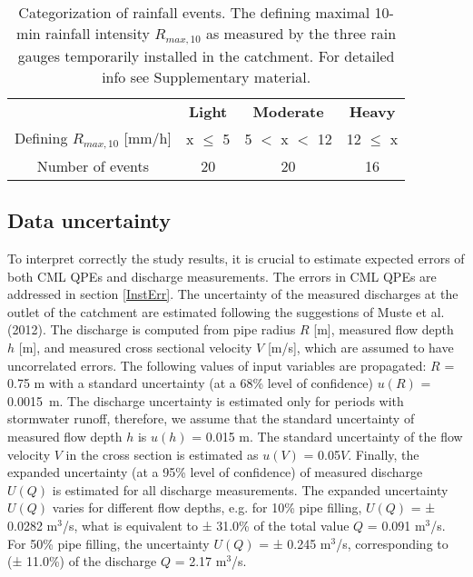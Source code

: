 \documentclass{ctuthesis}\usepackage[]{graphicx}\usepackage[]{color}
\begin{document}
\begin{table}[h]
\begin{ctucolortab}
\centering
\begin{tabular}{ c | c  c  c  }
	    &       \textbf{Light}   &  \bfseries Moderate  &  \bfseries  Heavy    \\ \Midrule
        Defining $R_{max,10}$ [mm/h]  &  x $\leq$ 5  & 5 $<$ x $<$ 12 &  12 $\leq$ x     \\
            Number of events  &  20  & 20 &  16
\end{tabular}
\caption{Categorization of rainfall events. The defining maximal 10-min rainfall intensity $R_{max,10}$ as measured by the three rain gauges temporarily installed in the catchment. For detailed info see Supplementary material.}
\label{2tab2}
\end{ctucolortab}
\end{table}



\subsection{Data uncertainty} \label{Quncer}

To interpret correctly the study results, it is crucial to estimate expected errors of both CML QPEs and discharge measurements. The errors in CML QPEs are addressed in section \ref{InstErr}. The uncertainty of the measured discharges at the outlet of the catchment are estimated following the suggestions of Muste et al. (2012). The discharge is computed from pipe radius $R$ [m], measured flow depth $h$ [m], and measured cross sectional velocity $V$ [m/s], which are assumed to have uncorrelated errors. The following values of input variables are propagated: $R$ = 0.75 m with a standard uncertainty (at a 68\% level of confidence) $u(R)$ = 0.0015~m. The discharge uncertainty is estimated only for periods with stormwater runoff, therefore, we assume that the standard uncertainty of measured flow depth $h$ is $u(h)$ = 0.015 m. The standard uncertainty of the flow velocity $V$ in the cross section is estimated as $u(V)$ = 0.05$V$. Finally, the expanded uncertainty (at a 95\% level of confidence) of measured discharge $U(Q)$ is estimated for all discharge measurements. The expanded uncertainty $U(Q)$ varies for different flow depths, e.g. for 10\% pipe filling, $U(Q)$ = ± 0.0282 m$^3$/s, what is equivalent to ± 31.0\% of the total value $Q$ = 0.091 m$^3$/s. For 50\% pipe filling, the uncertainty $U(Q)$ = ± 0.245 m$^3$/s, corresponding to (± 11.0\%) of the discharge $Q$ = 2.17 m$^3$/s.
\end{document}
